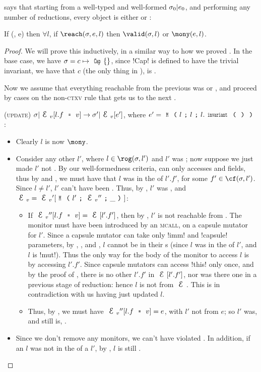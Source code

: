  says that starting from a well-typed and well-formed $\sigma_0|e_0$, and performing any number of reductions, every \reach object is either \valid or \mony:%
\SS\begin{theorem}\rm
If \VS(\s, e) then $\forall l$, if $\reach(\s, e, l)$ then $\valid(\s, l)$ or $\mony(e, l)$.
\end{theorem}\SS
\begin{proof}
We will prove this inductively, in a similar way to how we proved .
In the base case, we have $\s = c\mapsto\Kw{Cap}\{\}$, since \Q!Cap! is defined to have the trivial invariant, we have that $c$ (the only thing in \s), is \valid.

Now we assume that everything reachable from the previous \VS was \valid or \mony, and proceed by cases on the non-\textsc{ctxv} rule that gets us to the next \VS.
\begin{ienumerate}

	\item (\textsc{update}) $\s|\EV[l.f\equals v]\rightarrow \s'|\EV[e']$, where  $e'=\M{l}{l}{l.\invariant}$:
	\begin{itemize}
		\item Clearly $l$ is now $\mony$.
		\item Consider any other $l'$, where $l \in \rog(\s,l')$ and $l'$ was \valid; now suppose we just made $l'$ not \valid. By our well-formedness criteria, \Q@invariant@ can only accesses \Q@imm@ and \Q@capsule@ fields, thus by  and , we must have that $l$ was in the \rog of $l'.f'$, for some $f' \in \cf(\s, l')$. Since $l \neq l'$, $l'$ can't have been \WE. Thus, by , $l'$ was \HNO, and $\EV = \EV'[\M{l'}{\EV''}{\_}]$:
		\begin{itemize}
			\item If $\EV''[l.f \equals v] = \E[l'.f']$, then by \HNO, $l'$ is not reachable from \E. The monitor must have been introduced by an \textsc{mcall}, on a capsule mutator for $l'$. Since a capsule mutator can take only \Q!imm! and \Q!capsule! parameters, by , , and , $l$ cannot be in their \rog{}s (since $l$ was in the \rog of $l'$, and $l$ is \Q!mut!). Thus the only way for the body of the monitor to access $l$ is by accessing $l'.f'$.
			Since capsule mutators can access \Q!this! only once, and by the proof of , there is no other $l'.f'$ in $\E[l'.f']$, nor was there one in a previous stage of reduction: hence $l$ is not \reach from $\E$. This is in contradiction with us having just updated $l$.
			\item Thus, by \HNO, we must have $\EV''[l.f \equals v] = e$, with $l'$ not \reach from $e$; so $l'$ was, and still is, \mony.
		\end{itemize}
		\item Since we don't remove any monitors, we can't have violated \mony. In addition, if an $l$ was not in the \rog of a \valid $l'$, by , $l$ is still \valid.
	\end{itemize}


\end{ienumerate}
\end{proof}
